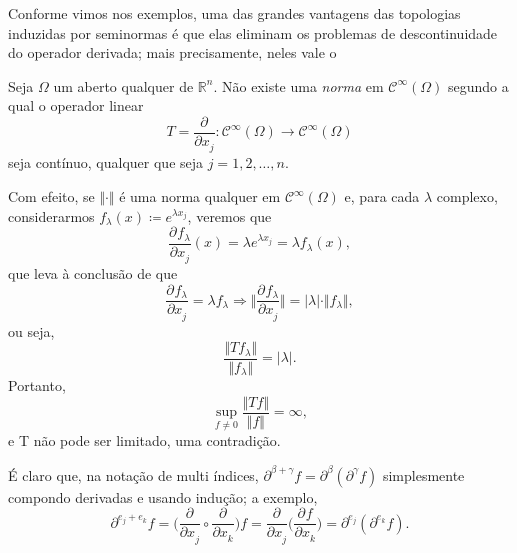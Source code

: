 \documentclass[../distribution_theory_notes.tex]{subfiles}
\begin{document}
    Conforme vimos nos exemplos, uma das grandes vantagens das topologias induzidas por seminormas é que elas eliminam os problemas de descontinuidade do operador derivada; mais precisamente, neles vale o 
   \begin{theorem*}
     Seja \(\Omega \) um aberto qualquer de \(\mathbb{R}^{n}\). Não existe uma \textit{norma} em \(\mathcal{C}^{\infty}(\Omega )\) segundo a qual o operador linear 
       \[
         T=\frac{\partial^{}}{\partial x_{j}^{}}:\mathcal{C}^{\infty}(\Omega )\rightarrow \mathcal{C}^{\infty}(\Omega )
       \]
       seja contínuo, qualquer que seja \(j=1,2,\dotsc ,n.\)
   \end{theorem*}
  \begin{proof*}
    Com efeito, se \(\Vert \cdot  \Vert\) é uma norma qualquer em \(\mathcal{C}^{\infty}(\Omega )\) e, para cada \(\lambda \) complexo, considerarmos \(f_{\lambda }(x)\coloneqq e^{\lambda x_{j}}\), veremos que 
      \[
        \frac{\partial^{}f_{\lambda }}{\partial x_{j}^{}}(x)=\lambda e^{\lambda x_{j}}=\lambda f_{\lambda }(x),
      \]
      que leva à conclusão de que 
        \[
          \frac{\partial^{}f_{\lambda }}{\partial x_{j}^{}} = \lambda f_{\lambda } \Rightarrow \biggl\Vert \frac{\partial^{}f_{\lambda }}{\partial x_{j}^{}} \biggr\Vert=|\lambda |\cdot \Vert f_{\lambda } \Vert,
        \]
        ou seja, 
          \[
            \frac{\Vert Tf_{\lambda } \Vert}{\Vert f_{\lambda } \Vert}=|\lambda |.
          \]
          Portanto, 
            \[
              \sup_{f\neq 0}\frac{\Vert Tf \Vert}{\Vert f \Vert}=\infty,
            \]
            e T não pode ser limitado, uma contradição. \qedsymbol
  \end{proof*}
   \begin{tcolorbox}[
   skin=enhanced,
   title=Observação,
   fonttitle=\bfseries,
 colframe=black,
   colbacktitle=cyan!75!white, 
   colback=cyan!15,
   colbacklower=black,
 coltitle=black,
   drop fuzzy shadow,
   ]
   É claro que, na notação de multi índices, \(\partial^{\beta +\gamma }f=\partial^{\beta }(\partial^{\gamma }f)\) simplesmente compondo derivadas e usando indução; a exemplo, 
     \[
       \partial^{e_{j}+e_{k}}f = \biggl(\frac{\partial^{}}{\partial x_{j}^{}}\circ \frac{\partial^{}}{\partial x_{k}^{}}\biggr)f = \frac{\partial^{}}{\partial x_{j}^{}}\biggl(\frac{\partial^{}f}{\partial x_{k}^{}}\biggr) = \partial^{e_{j}}(\partial^{e_{k}}f).
     \]
   \end{tcolorbox}
\end{document}
